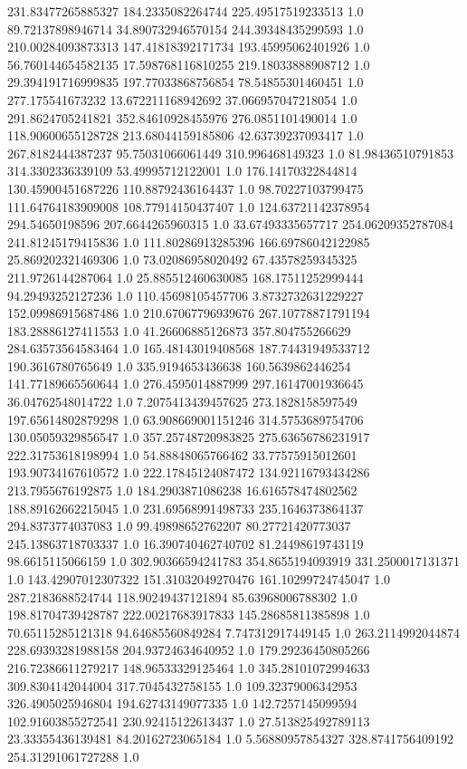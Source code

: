 231.83477265885327	184.2335082264744	225.49517519233513	1.0
89.72137898946714	34.890732946570154	244.39348435299593	1.0
210.00284093873313	147.41818392171734	193.45995062401926	1.0
56.760144654582135	17.598768116810255	219.18033888908712	1.0
29.394191716999835	197.77033868756854	78.54855301460451	1.0
277.175541673232	13.672211168942692	37.066957047218054	1.0
291.8624705241821	352.84610928455976	276.0851101490014	1.0
118.90600655128728	213.68044159185806	42.63739237093417	1.0
267.8182444387237	95.75031066061449	310.996468149323	1.0
81.98436510791853	314.3302336339109	53.49995712122001	1.0
176.14170322844814	130.45900451687226	110.88792436164437	1.0
98.70227103799475	111.64764183909008	108.77914150437407	1.0
124.63721142378954	294.54650198596	207.6644265960315	1.0
33.67493335657717	254.06209352787084	241.81245179415836	1.0
111.80286913285396	166.69786042122985	25.869202321469306	1.0
73.02086958020492	67.43578259345325	211.9726144287064	1.0
25.885512460630085	168.17511252999444	94.29493252127236	1.0
110.45698105457706	3.8732732631229227	152.09986915687486	1.0
210.67067796939676	267.10778871791194	183.28886127411553	1.0
41.26606885126873	357.804755266629	284.63573564583464	1.0
165.48143019408568	187.74431949533712	190.3616780765649	1.0
335.9194653436638	160.5639862446254	141.77189665560644	1.0
276.4595014887999	297.16147001936645	36.04762548014722	1.0
7.2075413439457625	273.1828158597549	197.65614802879298	1.0
63.908669001151246	314.5753689754706	130.05059329856547	1.0
357.25748720983825	275.63656786231917	222.31753618198994	1.0
54.88848065766462	33.77575915012601	193.90734167610572	1.0
222.17845124087472	134.92116793434286	213.7955676192875	1.0
184.2903871086238	16.616578474802562	188.89162662215045	1.0
231.69568991498733	235.1646373864137	294.8373774037083	1.0
99.49898652762207	80.27721420773037	245.13863718703337	1.0
16.390740462740702	81.24498619743119	98.6615115066159	1.0
302.90366594241783	354.8655194093919	331.2500017131371	1.0
143.42907012307322	151.31032049270476	161.10299724745047	1.0
287.2183688524744	118.90249437121894	85.63968006788302	1.0
198.81704739428787	222.00217683917833	145.28685811385898	1.0
70.65115285121318	94.64685560849284	7.747312917449145	1.0
263.2114992044874	228.69393281988158	204.93724634640952	1.0
179.29236450805266	216.72386611279217	148.96533329125464	1.0
345.28101072994633	309.8304142044004	317.7045432758155	1.0
109.32379006342953	326.4905025946804	194.62743149077335	1.0
142.7257145099594	102.91603855272541	230.92415122613437	1.0
27.513825492789113	23.33355436139481	84.20162723065184	1.0
5.56880957854327	328.8741756409192	254.31291061727288	1.0
